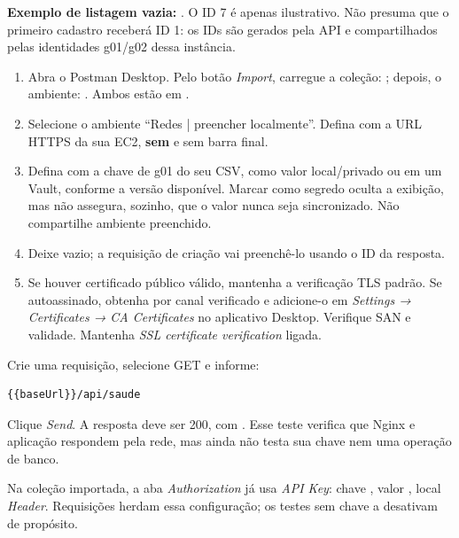 \textbf{Exemplo de listagem vazia:} . O ID 7 é apenas ilustrativo. Não presuma que o primeiro cadastro receberá ID 1: os IDs são gerados pela API e compartilhados pelas identidades g01/g02 dessa instância.

\begin{enumerate}
\item Abra o Postman Desktop. Pelo botão \textit{Import}, carregue a coleção:\newline
{}; depois, o ambiente:\newline
{}. Ambos estão em .
\item Selecione o ambiente ``Redes | preencher localmente''. Defina  com a URL HTTPS da sua EC2, \textbf{sem}  e sem barra final.
\item Defina  com a chave de g01 do seu CSV, como valor local/privado ou em um Vault, conforme a versão disponível. Marcar como segredo oculta a exibição, mas não assegura, sozinho, que o valor nunca seja sincronizado. Não compartilhe ambiente preenchido.
\item Deixe  vazio; a requisição de criação vai preenchê-lo usando o ID da resposta.
\item Se houver certificado público válido, mantenha a verificação TLS padrão. Se autoassinado, obtenha  por canal verificado e adicione-o em \textit{Settings → Certificates → CA Certificates} no aplicativo Desktop. Verifique SAN e validade. Mantenha \textit{SSL certificate verification} ligada.
\end{enumerate}

Crie uma requisição, selecione GET e informe:
\begin{lstlisting}
{{baseUrl}}/api/saude
\end{lstlisting}
Clique \textit{Send}. A resposta deve ser 200, com . Esse teste verifica que Nginx e aplicação respondem pela rede, mas ainda não testa sua chave nem uma operação de banco.

Na coleção importada, a aba \textit{Authorization} já usa \textit{API Key}: chave , valor , local \textit{Header}. Requisições herdam essa configuração; os testes sem chave a desativam de propósito.

